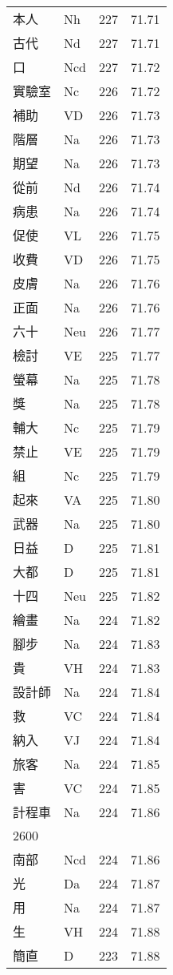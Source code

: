 \documentclass[twocolumn]{book}
\begin{document}
\begin{supertabular}{llrr}
本人 & Nh & 227 &  71.71\\
古代 & Nd & 227 &  71.71\\
口 & Ncd & 227 &  71.72\\
實驗室 & Nc & 226 &  71.72\\
補助 & VD & 226 &  71.73\\
階層 & Na & 226 &  71.73\\
期望 & Na & 226 &  71.73\\
從前 & Nd & 226 &  71.74\\
病患 & Na & 226 &  71.74\\
促使 & VL & 226 &  71.75\\
收費 & VD & 226 &  71.75\\
皮膚 & Na & 226 &  71.76\\
正面 & Na & 226 &  71.76\\
六十 & Neu & 226 &  71.77\\
檢討 & VE & 225 &  71.77\\
螢幕 & Na & 225 &  71.78\\
獎 & Na & 225 &  71.78\\
輔大 & Nc & 225 &  71.79\\
禁止 & VE & 225 &  71.79\\
組 & Nc & 225 &  71.79\\
起來 & VA & 225 &  71.80\\
武器 & Na & 225 &  71.80\\
日益 & D & 225 &  71.81\\
大都 & D & 225 &  71.81\\
十四 & Neu & 225 &  71.82\\
繪畫 & Na & 224 &  71.82\\
腳步 & Na & 224 &  71.83\\
貴 & VH & 224 &  71.83\\
設計師 & Na & 224 &  71.84\\
救 & VC & 224 &  71.84\\
納入 & VJ & 224 &  71.84\\
旅客 & Na & 224 &  71.85\\
害 & VC & 224 &  71.85\\
計程車 & Na & 224 &  71.86\\
2600\\
南部 & Ncd & 224 &  71.86\\
光 & Da & 224 &  71.87\\
用 & Na & 224 &  71.87\\
生 & VH & 224 &  71.88\\
簡直 & D & 223 &  71.88\\

\end{supertabular}
\end{document}
